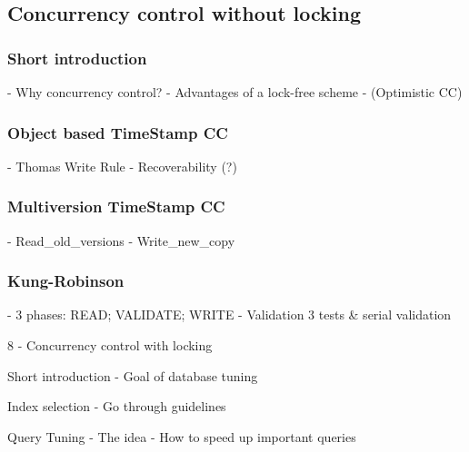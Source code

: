 \documentclass[a4paper,10pt,titlepage]{report}
\begin{document}
    
    
    \newpage
\subsection{Concurrency control without locking}

\subsubsection{Short introduction}
- Why concurrency control?
- Advantages of a lock-free scheme
- (Optimistic CC)

\subsubsection{Object based TimeStamp CC}
- Thomas Write Rule
- Recoverability (?)

\subsubsection{Multiversion TimeStamp CC}
- Read\_old\_versions
- Write\_new\_copy

\subsubsection{Kung-Robinson}
- 3 phases: READ; VALIDATE; WRITE
- Validation 3 tests \& serial validation


8 - Concurrency control with locking

Short introduction
- Goal of database tuning

Index selection
- Go through guidelines

Query Tuning
- The idea
- How to speed up important queries
\end{document}
